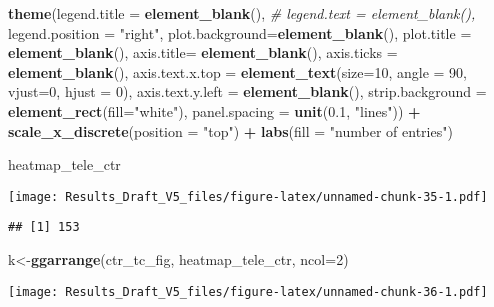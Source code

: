 \documentclass[
]{article}
\newenvironment{Shaded}{\begin{snugshade}}{\end{snugshade}}
\newcommand{\CommentTok}[1]{\textcolor[rgb]{0.56,0.35,0.01}{\textit{#1}}}
\newcommand{\DataTypeTok}[1]{\textcolor[rgb]{0.13,0.29,0.53}{#1}}
\newcommand{\DecValTok}[1]{\textcolor[rgb]{0.00,0.00,0.81}{#1}}
\newcommand{\FloatTok}[1]{\textcolor[rgb]{0.00,0.00,0.81}{#1}}
\newcommand{\KeywordTok}[1]{\textcolor[rgb]{0.13,0.29,0.53}{\textbf{#1}}}
\newcommand{\NormalTok}[1]{#1}
\newcommand{\OperatorTok}[1]{\textcolor[rgb]{0.81,0.36,0.00}{\textbf{#1}}}
\newcommand{\StringTok}[1]{\textcolor[rgb]{0.31,0.60,0.02}{#1}}
\begin{document}
\begin{Shaded}
\begin{Highlighting}[]
\StringTok{                      }\KeywordTok{theme}\NormalTok{(}\DataTypeTok{legend.title =} \KeywordTok{element_blank}\NormalTok{(),}
                      \CommentTok{# legend.text = element_blank(),}
                      \DataTypeTok{legend.position =} \StringTok{"right"}\NormalTok{,}
                      \DataTypeTok{plot.background=}\KeywordTok{element_blank}\NormalTok{(),}
                      \DataTypeTok{plot.title =} \KeywordTok{element_blank}\NormalTok{(),}
                      \DataTypeTok{axis.title=} \KeywordTok{element_blank}\NormalTok{(),}
                      \DataTypeTok{axis.ticks =} \KeywordTok{element_blank}\NormalTok{(),}
                      \DataTypeTok{axis.text.x.top =} \KeywordTok{element_text}\NormalTok{(}\DataTypeTok{size=}\DecValTok{10}\NormalTok{, }\DataTypeTok{angle =} \DecValTok{90}\NormalTok{, }\DataTypeTok{vjust=}\DecValTok{0}\NormalTok{,}
                                                     \DataTypeTok{hjust =} \DecValTok{0}\NormalTok{),}
                      \DataTypeTok{axis.text.y.left =} \KeywordTok{element_blank}\NormalTok{(),}
                      \DataTypeTok{strip.background =} \KeywordTok{element_rect}\NormalTok{(}\DataTypeTok{fill=}\StringTok{"white"}\NormalTok{),}
                      \DataTypeTok{panel.spacing =} \KeywordTok{unit}\NormalTok{(}\FloatTok{0.1}\NormalTok{, }\StringTok{"lines"}\NormalTok{)) }\OperatorTok{+}
\StringTok{                      }\KeywordTok{scale_x_discrete}\NormalTok{(}\DataTypeTok{position =} \StringTok{"top"}\NormalTok{) }\OperatorTok{+}
\StringTok{                      }\KeywordTok{labs}\NormalTok{(}\DataTypeTok{fill =} \StringTok{"number of entries"}\NormalTok{)}

\NormalTok{heatmap_tele_ctr}
\end{Highlighting}
\end{Shaded}

\texttt{[image: Results\_Draft\_V5\_files/figure-latex/unnamed-chunk-35-1.pdf]}

\begin{verbatim}
## [1] 153
\end{verbatim}

\begin{Shaded}
\begin{Highlighting}[]
\NormalTok{k<-}\KeywordTok{ggarrange}\NormalTok{(ctr_tc_fig, heatmap_tele_ctr, }\DataTypeTok{ncol=}\DecValTok{2}\NormalTok{)}
\end{Highlighting}
\end{Shaded}

\texttt{[image: Results\_Draft\_V5\_files/figure-latex/unnamed-chunk-36-1.pdf]}
\end{document}
